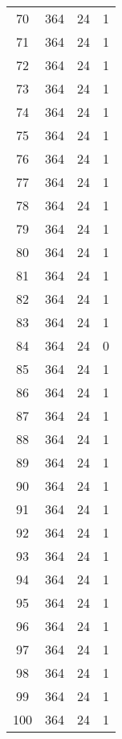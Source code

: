 \begin{longtable}[!]{c|ccc}
	70	& 364	& 24	& 1	\\
	71	& 364	& 24	& 1	\\
	72	& 364	& 24	& 1	\\
	73	& 364	& 24	& 1	\\
	74	& 364	& 24	& 1	\\
	75	& 364	& 24	& 1	\\
	76	& 364	& 24	& 1	\\
	77	& 364	& 24	& 1	\\
	78	& 364	& 24	& 1	\\
	79	& 364	& 24	& 1	\\
	80	& 364	& 24	& 1	\\
	81	& 364	& 24	& 1	\\
	82	& 364	& 24	& 1	\\
	83	& 364	& 24	& 1	\\
	84	& 364	& 24	& 0	\\
	85	& 364	& 24	& 1	\\
	86	& 364	& 24	& 1	\\
	87	& 364	& 24	& 1	\\
	88	& 364	& 24	& 1	\\
	89	& 364	& 24	& 1	\\
	90	& 364	& 24	& 1	\\
	91	& 364	& 24	& 1	\\
	92	& 364	& 24	& 1	\\
	93	& 364	& 24	& 1	\\
	94	& 364	& 24	& 1	\\
	95	& 364	& 24	& 1	\\
	96	& 364	& 24	& 1	\\
	97	& 364	& 24	& 1	\\
	98	& 364	& 24	& 1	\\
	99	& 364	& 24	& 1	\\
	100	& 364	& 24	& 1	\\
\end{longtable}


